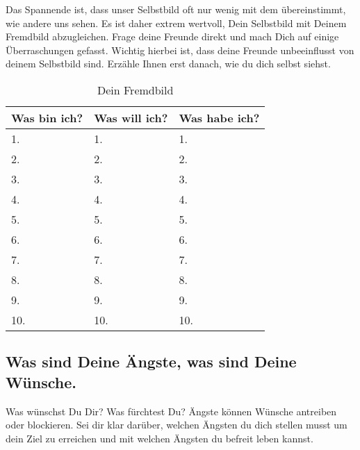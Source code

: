 \documentclass[../Lebensziel.tex]{subfiles}
\begin{document}
Das Spannende ist, dass unser Selbstbild oft nur wenig mit dem übereinstimmt, wie andere uns sehen.
Es ist daher extrem wertvoll, Dein Selbstbild mit Deinem Fremdbild abzugleichen. Frage deine Freunde direkt und mach Dich auf einige Überraschungen gefasst. Wichtig hierbei ist, dass deine Freunde unbeeinflusst von deinem Selbstbild sind.
Erzähle Ihnen erst danach, wie du dich selbst siehst.
\newpage
\begin{table}[h!]
    \centering
    \setlength{\tabcolsep}{18pt}
    \renewcommand{\arraystretch}{1.5}
    \begin{tabular}{p{3.3cm}|p{3.3cm}|p{3.3cm}}
        \textbf{Was bin ich?} & \textbf{Was will ich?} & \textbf{Was habe ich?} \\\hline
        1.                    & 1.                     & 1.                     \\\hline
        2.                    & 2.                     & 2.                     \\\hline
        3.                    & 3.                     & 3.                     \\\hline
        4.                    & 4.                     & 4.                     \\\hline
        5.                    & 5.                     & 5.                     \\\hline
        6.                    & 6.                     & 6.                     \\\hline
        7.                    & 7.                     & 7.                     \\\hline
        8.                    & 8.                     & 8.                     \\\hline
        9.                    & 9.                     & 9.                     \\\hline
        10.                   & 10.                    & 10.
    \end{tabular}
    \caption{Dein Fremdbild}
    \label{fremdbild}
\end{table}
\newpage

\subsection*{Was sind Deine Ängste, was sind Deine Wünsche.}
Was wünschst Du Dir? Was fürchtest Du? Ängste können Wünsche antreiben oder blockieren. Sei dir klar darüber, welchen Ängsten du dich stellen musst um dein Ziel zu erreichen und mit welchen Ängsten du befreit leben kannst.
\end{document}
